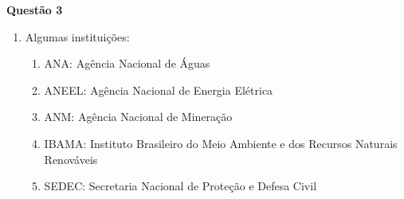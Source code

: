 \item[]\textbf{Questão 3}

\begin{enumerate}
\item Algumas instituições: 
\begin{enumerate}
	\item ANA: Agência Nacional de Águas
	\item ANEEL: Agência Nacional de Energia Elétrica
	\item ANM: Agência Nacional de Mineração
	\item IBAMA: Instituto Brasileiro do Meio Ambiente e dos Recursos Naturais Renováveis
	\item SEDEC: Secretaria Nacional de Proteção e Defesa Civil
\end{enumerate}
\end{enumerate}
